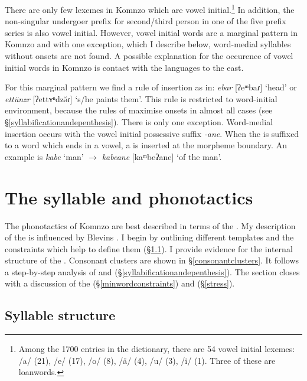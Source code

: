 There are only few lexemes in Komnzo which are vowel initial.\footnote{Among the 1700 entries in the dictionary, there are 54 vowel initial lexemes: /a/ (21), /e/ (17), /o/ (8), /ä/ (4), /u/ (3), /i/ (1). Three of these are loanwords.} In addition, the non-singular undergoer prefix for second/third person in one of the five prefix series is also vowel initial. However, vowel initial words are a marginal pattern in Komnzo and with one exception, which I describe below, word-medial syllables without onsets are not found. A possible explanation for the occurence of vowel initial words in Komnzo is contact with the  languages to the east.%

For this marginal pattern we find a rule of  insertion as in: \emph{ebar} [ʔeᵐbaɾ] `head' or \emph{ettünzr} [ʔettʏⁿdzə̆ɾ] `s/he paints them'. This rule is restricted to word-initial environment, because the rules of  maximise onsets in almost all cases (see \S{}\ref{syllabificationandepenthesis}). There is only one exception. Word-medial  insertion occurs with the vowel initial possessive suffix \emph{-ane}. When the  is suffixed to a word which ends in a vowel, a  is inserted at the morpheme boundary. An example is \emph{kabe} `man' $\rightarrow$ \emph{kabeane} [kaᵐbeʔane] `of the man'.

\section{The syllable and phonotactics} \label{syllable-and-phonotactics}

The phonotactics of Komnzo are best described in terms of the . My description of the  is influenced by Blevins \citeyearpar{Blevins:1995tt}. I begin by outlining different  templates and the constraints which help to define them (\S{}\ref{syllstruc}). I provide evidence for the internal structure of the . Consonant clusters are shown in \S\ref{consonantclusters}. It follows a step-by-step analysis of  and  (\S{}\ref{syllabificationandepenthesis}). The section closes with a discussion of the  (\S\ref{minwordconstraints}) and  (\S{}\ref{stress}).

\subsection{Syllable structure} \label{syllstruc}

